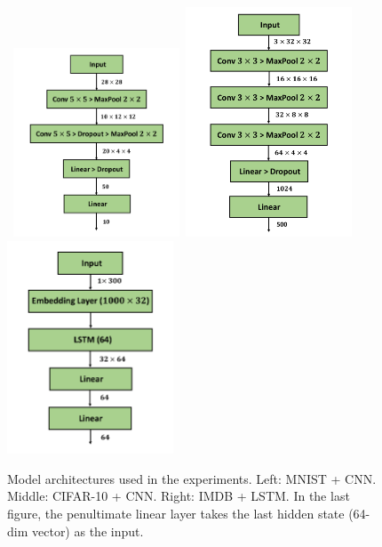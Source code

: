\documentclass[11pt]{article}
\begin{document}
\begin{figure}[h]
    \begin{center}
    \mbox{\hspace{-0.1in}
        \includegraphics[width=1.95in]{plot/mnist_arch.pdf}\hspace{-0.1in}
        \includegraphics[width=1.95in]{plot/cifar_arch.pdf}
        \hspace{-0.1in}
        \includegraphics[width=1.95in]{plot/imdb_arch.pdf}
    }
    \end{center}
	\caption{Model architectures used in the experiments. Left: MNIST + CNN. Middle: CIFAR-10 + CNN. Right: IMDB + LSTM. In the last figure, the penultimate linear layer takes the last hidden state (64-dim vector) as the input.}
	\label{fig:model arch}
\end{figure}
\end{document}
